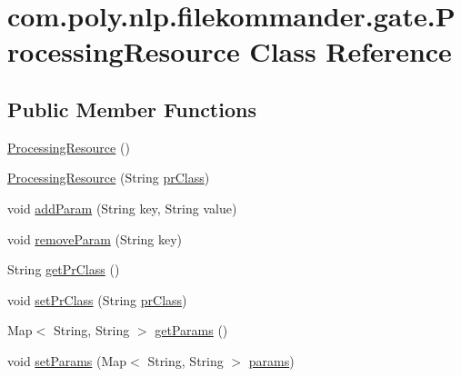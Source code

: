\hypertarget{classcom_1_1poly_1_1nlp_1_1filekommander_1_1gate_1_1_processing_resource}{\section{com.\-poly.\-nlp.\-filekommander.\-gate.\-Processing\-Resource Class Reference}
\label{classcom_1_1poly_1_1nlp_1_1filekommander_1_1gate_1_1_processing_resource}
}
\subsection*{Public Member Functions}
\begin{DoxyCompactItemize}
\item 
\hyperlink{classcom_1_1poly_1_1nlp_1_1filekommander_1_1gate_1_1_processing_resource_a282db6a35844443df6cfaddce71e588f}{Processing\-Resource} ()
\item 
\hyperlink{classcom_1_1poly_1_1nlp_1_1filekommander_1_1gate_1_1_processing_resource_a33a54a56cbf52bbb61a67e8d33836956}{Processing\-Resource} (String \hyperlink{classcom_1_1poly_1_1nlp_1_1filekommander_1_1gate_1_1_processing_resource_a018942d9b39afb00b7d92e874246f191}{pr\-Class})
\item 
void \hyperlink{classcom_1_1poly_1_1nlp_1_1filekommander_1_1gate_1_1_processing_resource_ab13448d5922bfe4ab13f5b17abe0a04f}{add\-Param} (String key, String value)
\item 
void \hyperlink{classcom_1_1poly_1_1nlp_1_1filekommander_1_1gate_1_1_processing_resource_a3017ede3560bc652656ec2519543b572}{remove\-Param} (String key)
\item 
String \hyperlink{classcom_1_1poly_1_1nlp_1_1filekommander_1_1gate_1_1_processing_resource_aecbfe57e11798241a78466ac8a97811b}{get\-Pr\-Class} ()
\item 
void \hyperlink{classcom_1_1poly_1_1nlp_1_1filekommander_1_1gate_1_1_processing_resource_a1edadf63e98f370d1a61c457ed433dbb}{set\-Pr\-Class} (String \hyperlink{classcom_1_1poly_1_1nlp_1_1filekommander_1_1gate_1_1_processing_resource_a018942d9b39afb00b7d92e874246f191}{pr\-Class})
\item 
Map$<$ String, String $>$ \hyperlink{classcom_1_1poly_1_1nlp_1_1filekommander_1_1gate_1_1_processing_resource_ac9133bcf39aaae347c94a4fd2c1a5bda}{get\-Params} ()
\item 
void \hyperlink{classcom_1_1poly_1_1nlp_1_1filekommander_1_1gate_1_1_processing_resource_a8dff2c1014fc6fbc88474a80905e97ee}{set\-Params} (Map$<$ String, String $>$ \hyperlink{classcom_1_1poly_1_1nlp_1_1filekommander_1_1gate_1_1_processing_resource_a9d38f54ab731c5b496b0583bd8dcce9b}{params})
\end{DoxyCompactItemize}
